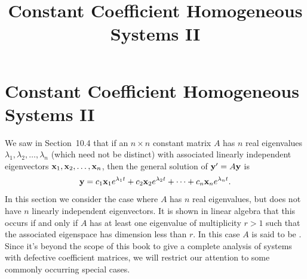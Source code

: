\documentclass{ximera}
\title{Constant Coefficient Homogeneous Systems II}%
\begin{document}
\begin{abstract}

\end{abstract}

\maketitle

\section*{Constant Coefficient Homogeneous Systems II}

We saw in Section~10.4 that if an $n\times n$
constant matrix
$A$ has $n$ real eigenvalues $\lambda_1, \lambda_2, \dots, \lambda_n$
(which need not be distinct) with associated linearly independent
eigenvectors ${\bf x}_1, {\bf x}_2, \dots, {\bf x}_n$, then the general
solution of ${\bf y}'=A{\bf y}$ is
$$
{\bf y}=c_1{\bf x}_1e^{\lambda_1t}+c_2{\bf x}_2e^{\lambda_2 t}
+\cdots+c_n{\bf x}_ne^{\lambda_n t}.
$$
In this section we consider the case where $A$ has $n$ real
eigenvalues, but does not have $n$ linearly independent eigenvectors.
It is shown in linear algebra that this occurs if and only if $A$ has
at least one eigenvalue of multiplicity $r>1$ such that the associated
eigenspace has dimension less than $r$. In this case $A$ is said to be
. Since it's beyond the scope of this book to give a
complete analysis of systems with defective coefficient matrices, we
will restrict our attention to some commonly occurring special cases.
\end{document}
